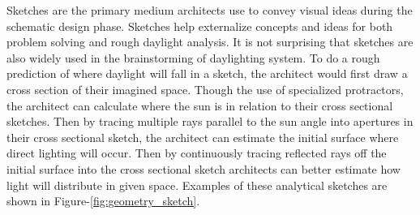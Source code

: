 
  Sketches are the primary medium architects use to convey visual ideas during the schematic design phase.
  Sketches help externalize concepts and ideas for both problem solving and rough daylight analysis\cite{Suwa,yancy}.
  It is not surprising that sketches are also widely used in the brainstorming of daylighting system.
  To do a rough prediction of where daylight will fall in a sketch, the architect would first draw a cross section of their imagined space.
  Though the use of specialized protractors, the architect can calculate where the sun is in relation to their cross sectional sketches\cite{james1976sun}.
  Then by tracing multiple rays parallel to the sun angle into apertures in their cross sectional sketch, the architect can estimate the initial surface where direct lighting will occur.
  Then by continuously tracing reflected rays off the initial surface into the cross sectional sketch architects can better estimate how light will distribute in given space.
  Examples of these analytical sketches are shown in Figure-\ref{fig:geometry_sketch}. \\

